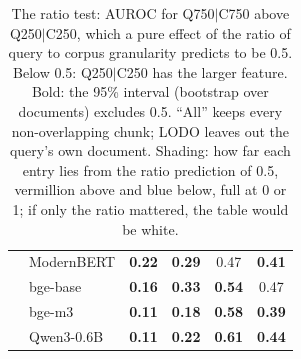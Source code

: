 \begin{table}[htbp]
\begin{tabular}{llcccc}
 & ModernBERT & \cellcolor{tabB!25}\textbf{0.22} & \cellcolor{tabB!19}\textbf{0.29} & \cellcolor{tabB!3}0.47 & \cellcolor{tabB!8}\textbf{0.41} \\
 & bge-base & \cellcolor{tabB!30}\textbf{0.16} & \cellcolor{tabB!15}\textbf{0.33} & \cellcolor{tabV!3}\textbf{0.54} & \cellcolor{tabB!3}0.47 \\
 & bge-m3 & \cellcolor{tabB!35}\textbf{0.11} & \cellcolor{tabB!29}\textbf{0.18} & \cellcolor{tabV!7}\textbf{0.58} & \cellcolor{tabB!10}\textbf{0.39} \\
 & Qwen3-0.6B & \cellcolor{tabB!35}\textbf{0.11} & \cellcolor{tabB!25}\textbf{0.22} & \cellcolor{tabV!10}\textbf{0.61} & \cellcolor{tabB!5}\textbf{0.44} \\
\bottomrule
\end{tabular}
\caption{The ratio test: AUROC for Q750$|$C750 above Q250$|$C250, which a pure effect of the ratio of query to corpus granularity predicts to be 0.5. Below 0.5: Q250$|$C250 has the larger feature. Bold: the 95\% interval (bootstrap over documents) excludes 0.5. ``All'' keeps every non-overlapping chunk; LODO leaves out the query's own document. Shading: how far each entry lies from the ratio prediction of 0.5, vermillion above and blue below, full at 0 or 1; if only the ratio mattered, the table would be white.}
\label{tab:ratio}
\end{table}
